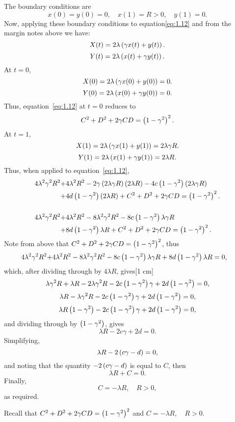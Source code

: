 The boundary conditions are
\[
	x(0)=y(0)=0,\quad x(1)=R>0,\quad y(1)=0.
\]
Now, applying these boundary conditions to equation\eqref{eq:1.12} and from the margin notes above we have:
\[
	X(t) = 2\lambda\left(\gamma x(t) + y(t)\right).
\]
\[
	Y(t) = 2\lambda\left(x(t) + \gamma y(t)\right).
\]
At $t=0$,
\[
	X(0) = 2\lambda\left(\gamma x(0) + y(0)\right) = 0.
\]
\[
	Y(0) = 2\lambda\left(x(0) + \gamma y(0)\right) = 0.
\]
Thus, equation~\eqref{eq:1.12} at $t=0$ reduces to 
\[
	C^2 + D^2 + 2\gamma C D = \left(1-\gamma^2\right)^2.
\]
At $t=1$,
\[
	X(1) = 2\lambda\left(\gamma x(1) + y(1)\right) = 2\lambda\gamma R.
\]
\[
	Y(1) = 2\lambda\left(x(1) + \gamma y(1)\right) = 2\lambda R.
\]
Thus, when applied to equation~\eqref{eq:1.12},
\begin{align*}
	4\lambda^2\gamma^2R^2 +& 4\lambda^2 R^2 -2\gamma\left(2\lambda\gamma R\right)\left(2\lambda R\right)-4c\left(1-\gamma^2\right)\left(2\lambda\gamma R\right)\\
	+& 4d\left(1-\gamma^2\right)\left(2\lambda R\right)+C^2+D^2 + 2\gamma CD = \left(1-\gamma^2\right)^2.\\\\
	4\lambda^2\gamma^2R^2 +& 4\lambda^2 R^2 - 8\lambda^2\gamma^2R^2 - 8c\left(1-\gamma^2\right)\lambda\gamma R\\
	+& 8d\left(1-\gamma^2\right)\lambda R + C^2+D^2 + 2\gamma CD = \left(1-\gamma^2\right)^2.
\end{align*}
Note from above that $C^2+D^2+2\gamma CD = \left(1-\gamma^2\right)^2$, thus
\begin{align*}
	4\lambda^2\gamma^2R^2 +& 4\lambda^2 R^2 - 8\lambda^2\gamma^2R^2 - 8c\left(1-\gamma^2\right)\lambda\gamma R
	+ 8d\left(1-\gamma^2\right)\lambda R = 0,
\end{align*}
which, after dividing through by $4\lambda R$, gives[1 cm]
\[
	\lambda\gamma^2R + \lambda R - 2\lambda\gamma^2R - 2c\left(1-\gamma^2\right)\gamma
	+ 2d\left(1-\gamma^2\right) = 0,
\]
\[
	\lambda R - \lambda\gamma^2R - 2c\left(1-\gamma^2\right)\gamma
	+ 2d\left(1-\gamma^2\right) = 0,
\]
\[
	\lambda R\left(1-\gamma^2\right) - 2c\left(1-\gamma^2\right)\gamma
	+ 2d\left(1-\gamma^2\right) = 0,
\]
and dividing through by $\left(1-\gamma^2\right)$, gives
\[
	\lambda R - 2c\gamma+ 2d = 0.
\]
Simplifying,
\[
	\lambda R - 2\left(c\gamma - d\right) = 0,
\]
and noting that the quantity $-2\left(c\gamma - d\right)$ is equal to $C$, then
\[
	\lambda R + C = 0.
\]
Finally, 
\begin{equation}
\label{eq:1.13}
	\boxed{C=-\lambda R,\quad R > 0,}
\end{equation}
as required.

Recall that $C^2+D^2+2\gamma CD = \left(1-\gamma^2\right)^2$ and $C=-\lambda R,\quad R > 0$. 

